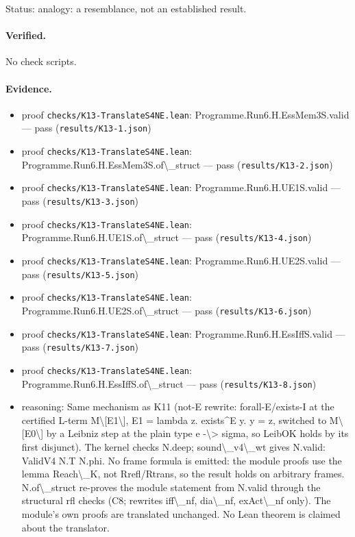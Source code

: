 \documentclass{article}
\begin{document}
Status: analogy: a resemblance, not an established result.

\paragraph{Verified.}
No check scripts.

\paragraph{Evidence.}
\begin{itemize}
\item proof \texttt{checks/K13-TranslateS4NE.lean}: Programme.Run6.H.EssMem3S.valid --- pass (\texttt{results/K13-1.json})
\item proof \texttt{checks/K13-TranslateS4NE.lean}: Programme.Run6.H.EssMem3S.of\textbackslash{}\_struct --- pass (\texttt{results/K13-2.json})
\item proof \texttt{checks/K13-TranslateS4NE.lean}: Programme.Run6.H.UE1S.valid --- pass (\texttt{results/K13-3.json})
\item proof \texttt{checks/K13-TranslateS4NE.lean}: Programme.Run6.H.UE1S.of\textbackslash{}\_struct --- pass (\texttt{results/K13-4.json})
\item proof \texttt{checks/K13-TranslateS4NE.lean}: Programme.Run6.H.UE2S.valid --- pass (\texttt{results/K13-5.json})
\item proof \texttt{checks/K13-TranslateS4NE.lean}: Programme.Run6.H.UE2S.of\textbackslash{}\_struct --- pass (\texttt{results/K13-6.json})
\item proof \texttt{checks/K13-TranslateS4NE.lean}: Programme.Run6.H.EssIffS.valid --- pass (\texttt{results/K13-7.json})
\item proof \texttt{checks/K13-TranslateS4NE.lean}: Programme.Run6.H.EssIffS.of\textbackslash{}\_struct --- pass (\texttt{results/K13-8.json})
\item reasoning: Same mechanism as K11 (not-E rewrite: forall-E/exists-I at the certified L-term M\textbackslash{}[E1\textbackslash{}], E1 = lambda z. exists\textasciicircum{}E y. y = z, switched to M\textbackslash{}[E0\textbackslash{}] by a Leibniz step at the plain type e -\textbackslash{}\textgreater{} sigma, so LeibOK holds by its first disjunct). The kernel checks N.deep; sound\textbackslash{}\_v4\textbackslash{}\_wt gives N.valid: ValidV4 N.T N.phi. No frame formula is emitted: the module proofs use the lemma Reach\textbackslash{}\_K, not Rrefl/Rtrans, so the result holds on arbitrary frames. N.of\textbackslash{}\_struct re-proves the module statement from N.valid through the structural rfl checks (C8; rewrites iff\textbackslash{}\_nf, dia\textbackslash{}\_nf, exAct\textbackslash{}\_nf only). The module's own proofs are translated unchanged. No Lean theorem is claimed about the translator.
\end{itemize}
\end{document}
